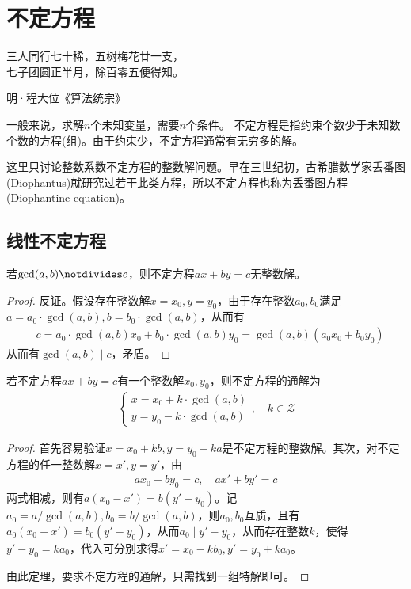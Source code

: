 
\chapter{不定方程}
\label{chap:diophantine-equation}

\epigraph{三人同行七十稀，五树梅花廿一支，\\七子团圆正半月，除百零五便得知。}{明·程大位《算法统宗》}

一般来说，求解$n$个未知变量，需要$n$个条件。
不定方程是指约束个数少于未知数个数的方程(组)。由于约束少，不定方程通常有无穷多的解。

这里只讨论整数系数不定方程的整数解问题。早在三世纪初，古希腊数学家丢番图(Diophantus)就研究过若干此类方程，所以不定方程也称为丢番图方程(Diophantine equation)。

\section{线性不定方程}
\label{sec:linear-diophantine-equation}

\begin{theorem}
  若$\gcd(a,b)\notdivides c$，则不定方程$ax+by=c$无整数解。
\end{theorem}
\begin{proof}
  反证。假设存在整数解$x=x_0, y=y_0$，由于存在整数$a_0,b_0$满足$a=a_0\cdot\gcd(a,b), b=b_0\cdot\gcd(a,b)$，从而有
  \begin{align*}
    &c=a_0\cdot\gcd(a,b)x_0 + b_0\cdot\gcd(a,b)y_0=\gcd(a,b)(a_0x_0+b_0y_0)
  \end{align*}
  从而有$\gcd(a,b)\mid c$，矛盾。
\end{proof}

\begin{theorem}
  若不定方程$ax+by=c$有一个整数解$x_0, y_0$，则不定方程的通解为
  \begin{align*}
    \begin{cases}
      x=x_0+k\cdot\gcd(a,b)\\
      y=y_0-k\cdot\gcd(a,b)
    \end{cases}, \quad k\in\mathcal{Z}
  \end{align*}
\end{theorem}
\begin{proof}
  首先容易验证$x=x_0+kb, y=y_0-ka$是不定方程的整数解。其次，对不定方程的任一整数解$x=x', y=y'$，由
  \begin{align*}
    ax_0 + by_0 =c, \quad ax' + by' =c
  \end{align*}
  两式相减，则有$a(x_0-x')=b(y'-y_0)$。记$a_0=a/\gcd(a,b), b_0=b/\gcd(a,b)$，则$a_0,b_0$互质，且有$a_0(x_0-x')=b_0(y'-y_0)$，从而$a_0\mid y'-y_0$，从而存在整数$k$，使得$y'-y_0=ka_0$，代入可分别求得$x'=x_0-kb_0, y'=y_0+ka_0$。

  由此定理，要求不定方程的通解，只需找到一组特解即可。
\end{proof}

